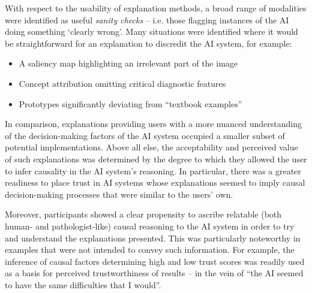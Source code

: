 
With respect to the usability of explanation methods, a broad range of modalities were identified as useful \textit{sanity checks} -- i.e. those flagging instances of the AI doing something `clearly wrong'. Many situations were identified where it would be straightforward for an explanation to discredit the AI system, for example: 

\begin{itemize}
    \item A saliency map highlighting an irrelevant part of the image
    \item Concept attribution omitting critical diagnostic features
    \item Prototypes significantly deviating from ``textbook examples''
\end{itemize}


In comparison, explanations providing users with a more nuanced understanding of the decision-making factors of the AI system occupied a smaller subset of potential implementations. Above all else, the acceptability and perceived value of such explanations was determined by the degree to which they allowed the user to infer causality in the AI system's reasoning. In particular, there was a greater readiness to place trust in AI systems whose explanations seemed to imply causal decision-making processes that were similar to the users' own.


Moreover, participants showed a clear propensity to ascribe relatable (both human- and pathologist-like) causal reasoning to the AI system in order to try and understand the explanations presented. This was particularly noteworthy in examples that were not intended to convey such information. For example, the inference of causal factors determining high and low trust scores was readily used as a basis for perceived trustworthiness of results -- in the vein of ``the AI seemed to have the same difficulties that I would''.

